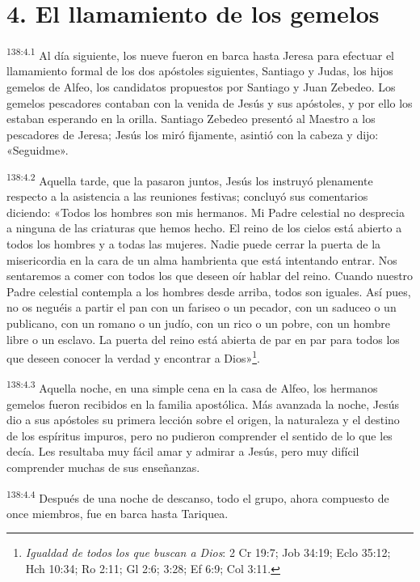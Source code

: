 \section*{4. El llamamiento de los gemelos}
\par
\textsuperscript{138:4.1} Al día siguiente, los nueve fueron en barca hasta Jeresa para efectuar el llamamiento formal de los dos apóstoles siguientes, Santiago y Judas, los hijos gemelos de Alfeo, los candidatos propuestos por Santiago y Juan Zebedeo. Los gemelos pescadores contaban con la venida de Jesús y sus apóstoles, y por ello los estaban esperando en la orilla. Santiago Zebedeo presentó al Maestro a los pescadores de Jeresa; Jesús los miró fijamente, asintió con la cabeza y dijo: «Seguidme».

\par
\textsuperscript{138:4.2} Aquella tarde, que la pasaron juntos, Jesús los instruyó plenamente respecto a la asistencia a las reuniones festivas; concluyó sus comentarios diciendo: «Todos los hombres son mis hermanos. Mi Padre celestial no desprecia a ninguna de las criaturas que hemos hecho. El reino de los cielos está abierto a todos los hombres y a todas las mujeres. Nadie puede cerrar la puerta de la misericordia en la cara de un alma hambrienta que está intentando entrar. Nos sentaremos a comer con todos los que deseen oír hablar del reino. Cuando nuestro Padre celestial contempla a los hombres desde arriba, todos son iguales. Así pues, no os neguéis a partir el pan con un fariseo o un pecador, con un saduceo o un publicano, con un romano o un judío, con un rico o un pobre, con un hombre libre o un esclavo. La puerta del reino está abierta de par en par para todos los que deseen conocer la verdad y encontrar a Dios»\footnote{\textit{Igualdad de todos los que buscan a Dios}: 2 Cr 19:7; Job 34:19; Eclo 35:12; Hch 10:34; Ro 2:11; Gl 2:6; 3:28; Ef 6:9; Col 3:11.}.

\par
\textsuperscript{138:4.3} Aquella noche, en una simple cena en la casa de Alfeo, los hermanos gemelos fueron recibidos en la familia apostólica. Más avanzada la noche, Jesús dio a sus apóstoles su primera lección sobre el origen, la naturaleza y el destino de los espíritus impuros, pero no pudieron comprender el sentido de lo que les decía. Les resultaba muy fácil amar y admirar a Jesús, pero muy difícil comprender muchas de sus enseñanzas.

\par
\textsuperscript{138:4.4} Después de una noche de descanso, todo el grupo, ahora compuesto de once miembros, fue en barca hasta Tariquea.

